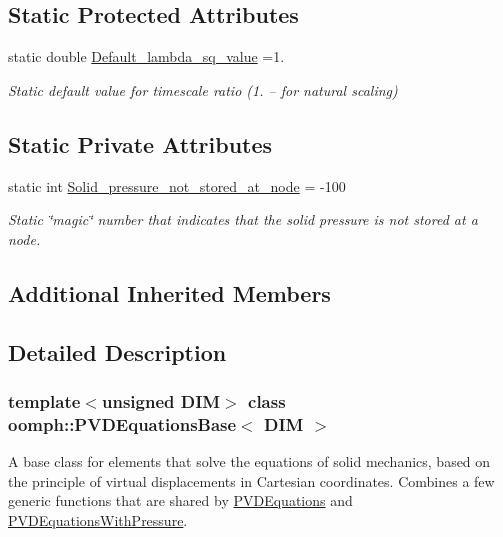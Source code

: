 \subsection*{Static Protected Attributes}
\begin{DoxyCompactItemize}
\item 
static double \hyperlink{classoomph_1_1PVDEquationsBase_a23f668bc7eb83a9614cb601a2bdfaffb}{Default\+\_\+lambda\+\_\+sq\+\_\+value} =1.
\begin{DoxyCompactList}\small\item\em Static default value for timescale ratio (1. -- for natural scaling) \end{DoxyCompactList}\end{DoxyCompactItemize}
\subsection*{Static Private Attributes}
\begin{DoxyCompactItemize}
\item 
static int \hyperlink{classoomph_1_1PVDEquationsBase_a8827854c304496d9d613a99a972dfd51}{Solid\+\_\+pressure\+\_\+not\+\_\+stored\+\_\+at\+\_\+node} = -\/100
\begin{DoxyCompactList}\small\item\em Static \char`\"{}magic\char`\"{} number that indicates that the solid pressure is not stored at a node. \end{DoxyCompactList}\end{DoxyCompactItemize}
\subsection*{Additional Inherited Members}


\subsection{Detailed Description}
\subsubsection*{template$<$unsigned D\+IM$>$\newline
class oomph\+::\+P\+V\+D\+Equations\+Base$<$ D\+I\+M $>$}

A base class for elements that solve the equations of solid mechanics, based on the principle of virtual displacements in Cartesian coordinates. Combines a few generic functions that are shared by \hyperlink{classoomph_1_1PVDEquations}{P\+V\+D\+Equations} and \hyperlink{classoomph_1_1PVDEquationsWithPressure}{P\+V\+D\+Equations\+With\+Pressure}. 

